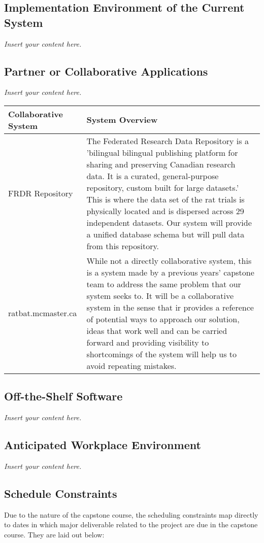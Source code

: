 \documentclass[12pt]{article}
\newcommand{\lips}{\textit{Insert your content here.}}
\begin{document}
\subsection{Implementation Environment of the Current System}
\lips
\subsection{Partner or Collaborative Applications}
\lips

\begin{tabular}{|m{5cm}|m{10cm}|}
    \hline
    Collaborative System & System Overview \\
    \hline
    FRDR Repository & The Federated Research Data Repository is a 'bilingual bilingual publishing 
    platform for sharing and 
    preserving Canadian research data. 
    It is a curated, general-purpose repository, 
    custom built for large datasets.' This is where the data set of the rat trials is physically located
    and is dispersed across 29 independent datasets. Our system will provide a unified database schema but will
    pull data from this repository.\\
    \hline
    ratbat.mcmaster.ca & While not a directly collaborative system, this is a system made by a previous years' capstone
    team to address the same problem that our system seeks to. It will be a collaborative system in the sense that ir provides
    a reference of potential ways to approach our solution, ideas that work well and can be carried forward
    and providing visibility to shortcomings of the system will help us to avoid repeating mistakes. \\
    \hline
\end{tabular}

\subsection{Off-the-Shelf Software}
\lips
\subsection{Anticipated Workplace Environment}
\lips
\subsection{Schedule Constraints}

\par{Due to the nature of the capstone course, the scheduling constraints
map directly to dates in which major deliverable related to the project are due in the capstone course.
They are laid out below:}
\end{document}
